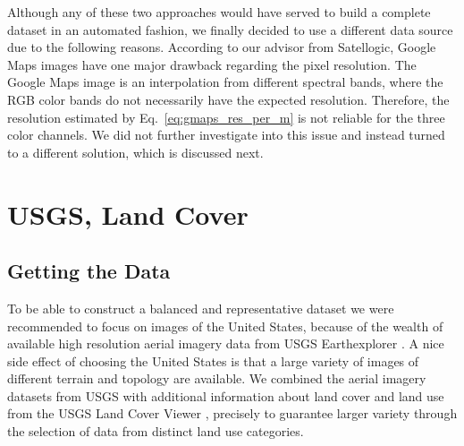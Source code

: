 Although any of these two approaches would have served to build a complete dataset in an automated fashion, we finally decided to use a different data source due to the following reasons. According to our advisor from Satellogic, Google Maps images have one major drawback regarding the pixel resolution. The Google Maps image is an interpolation from different spectral bands, where the RGB color bands do not necessarily have the expected resolution. Therefore, the resolution estimated by Eq.~\ref{eq:gmaps_res_per_m} is not reliable for the three color channels. We did not further investigate into this issue and instead turned to a different solution, which is discussed next.



\section{USGS, Land Cover}

\subsection{Getting the Data}\label{usgs_data}
To be able to construct a balanced and representative dataset we were recommended to focus on images of the United States, 
because of the wealth of available high resolution aerial imagery data from USGS Earthexplorer \parencite{usgs}. A nice side effect of choosing the United States is that a large variety of images of different terrain and topology are available. We combined the aerial imagery datasets from USGS with additional information about land cover and land use from the USGS Land Cover Viewer \parencite{land_cover_viewer}, precisely to guarantee larger variety through the selection of data from distinct land use categories.

